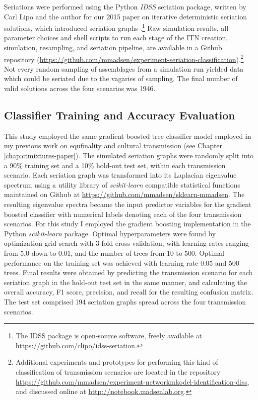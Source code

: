     Seriations were performed using the Python \emph{IDSS} seriation package, written by Carl Lipo and the author for our 2015 paper on iterative deterministic seriation solutions, which introduced seriation graphs \citep{Lipo2015}.\footnote{The IDSS package is open-source software, freely available at \url{https://github.com/clipo/idss-seriation}.}  Raw simulation results, all parameter choices and shell scripts to run each stage of the ITN creation, simulation, resampling, and seriation pipeline, are available in a Github repository (\url{https://github.com/mmadsen/experiment-seriation-classification}).\footnote{Additional experiments and prototypes for performing this kind of classification of transmission scenarios are located in the repository \url{https://github.com/mmadsen/experiment-networkmkodel-identification-diss}, and discussed online at \url{http://notebook.madsenlab.org}.}  Not every random sampling of assemblages from a simulation run yielded data which could be seriated due to the vagaries of sampling.  The final number of valid solutions across the four scenarios was 1946.
    
    \subsection{Classifier Training and Accuracy Evaluation}\label{metapop:sec:classifier}
    
    This study employed the same gradient boosted tree classifier model employed in my previous work on equfinality and cultural transmission (see Chapter \ref{chap:ctmixtures-paper}).  The simulated seriation graphs were randomly split into a 90\% training set and a 10\% hold-out test set, within each transmission scenario.  Each seriation graph was transformed into its Laplacian eigenvalue spectrum using a utility library of \emph{scikit-learn} compatible statistical functions maintained on Github at \url{https://github.com/mmadsen/sklearn-mmadsen}.  The resulting eigenvalue spectra became the input predictor variables for the gradient boosted classifier with numerical labels denoting each of the four transmission scenarios.  
    For this study I employed the gradient boosting implementation in the Python \emph{scikit-learn} package.  Optimal hyperparameters were found by optimization grid search with 3-fold cross validation, with learning rates ranging from 5.0 down to 0.01, and the number of trees from 10 to 500.  Optimal performance on the training set was achieved with learning rate 0.05 and 500 trees.  Final results were obtained by predicting the transmission scenario for each seriation graph in the hold-out test set in the same manner, and calculating the overall accuracy, F1 score, precision, and recall for the resulting confusion matrix.   The test set comprised 194 seriation graphs spread across the four transmission scenarios.
    

